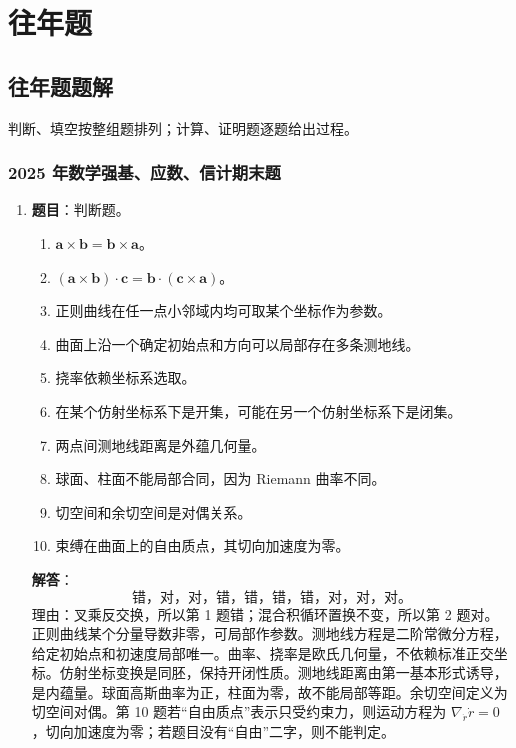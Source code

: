 \documentclass[UTF8,12pt,a4paper]{ctexart}
\newcommand{\vct}[1]{\boldsymbol{#1}}
\begin{document}
\fi

\section{往年题}

\subsection{往年题题解}
判断、填空按整组题排列；计算、证明题逐题给出过程。

\subsubsection{2025 年数学强基、应数、信计期末题}
\begin{enumerate}
\item \textbf{题目}：判断题。
\begin{enumerate}
\item $\vct a\times\vct b=\vct b\times\vct a$。
\item $(\vct a\times\vct b)\cdot\vct c=\vct b\cdot(\vct c\times\vct a)$。
\item 正则曲线在任一点小邻域内均可取某个坐标作为参数。
\item 曲面上沿一个确定初始点和方向可以局部存在多条测地线。
\item 挠率依赖坐标系选取。
\item 在某个仿射坐标系下是开集，可能在另一个仿射坐标系下是闭集。
\item 两点间测地线距离是外蕴几何量。
\item 球面、柱面不能局部合同，因为 Riemann 曲率不同。
\item 切空间和余切空间是对偶关系。
\item 束缚在曲面上的自由质点，其切向加速度为零。
\end{enumerate}

\textbf{解答}：
\[
\boxed{\text{错，对，对，错，错，错，错，对，对，对。}}
\]
理由：叉乘反交换，所以第 1 题错；混合积循环置换不变，所以第 2 题对。正则曲线某个分量导数非零，可局部作参数。测地线方程是二阶常微分方程，给定初始点和初速度局部唯一。曲率、挠率是欧氏几何量，不依赖标准正交坐标。仿射坐标变换是同胚，保持开闭性质。测地线距离由第一基本形式诱导，是内蕴量。球面高斯曲率为正，柱面为零，故不能局部等距。余切空间定义为切空间对偶。第 10 题若“自由质点”表示只受约束力，则运动方程为 $\nabla_{\dot r}\dot r=0$，切向加速度为零；若题目没有“自由”二字，则不能判定。


\end{enumerate}
\end{document}
